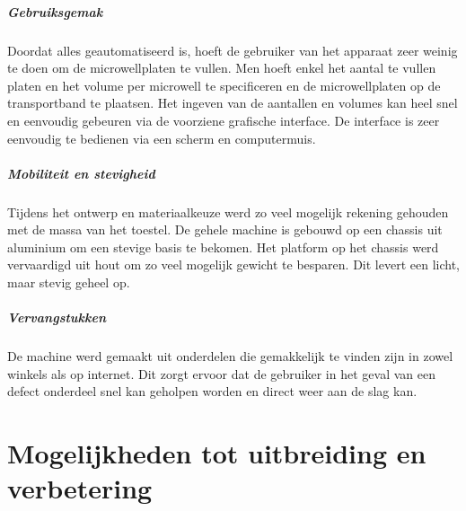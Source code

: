 \documentclass[a4paper,twoside,kulak]{kulakreport} %
\begin{document}
\paragraph{Gebruiksgemak}

Doordat alles geautomatiseerd is, hoeft de gebruiker van het apparaat zeer weinig te doen om de microwellplaten te vullen. Men hoeft enkel het aantal te vullen platen en het volume per microwell te specificeren en de microwellplaten op de transportband te plaatsen. Het ingeven van de aantallen en volumes kan heel snel en eenvoudig gebeuren via de voorziene grafische interface. De interface is zeer eenvoudig te bedienen via een scherm en computermuis.

\paragraph{Mobiliteit en stevigheid}

Tijdens het ontwerp en materiaalkeuze werd zo veel mogelijk rekening gehouden met de massa van het toestel. De gehele machine is gebouwd op een chassis uit aluminium om een stevige basis te bekomen. Het platform op het chassis werd vervaardigd uit hout om zo veel mogelijk gewicht te besparen. Dit levert een licht, maar stevig geheel op. 

\paragraph{Vervangstukken}

De machine werd gemaakt uit onderdelen die gemakkelijk te vinden zijn in zowel winkels als op internet. Dit zorgt ervoor dat de gebruiker in het geval van een defect onderdeel snel kan geholpen worden en direct weer aan de slag kan.

\chapter{Mogelijkheden tot uitbreiding en verbetering}
\end{document}
